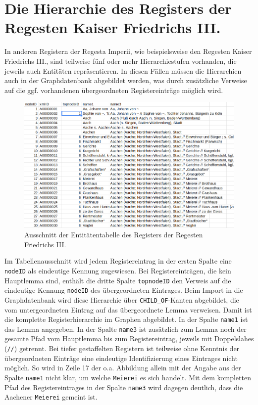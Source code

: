 \documentclass[ngerman,]{scrreprt}
\begin{document}
\section{Die Hierarchie des Registers der Regesten Kaiser Friedrichs III.}\label{die-hierarchie-des-registers-der-regesten-kaiser-friedrichs-iii.}

In anderen Registern der Regesta Imperii, wie beispielsweise den Regesten Kaiser Friedrichs III., sind teilweise fünf oder mehr Hierarchiestufen vorhanden, die jeweils auch Entitäten repräsentieren. In diesen Fällen müssen die Hierarchien auch in der Graphdatenbank abgebildet werden, was durch zusätzliche Verweise auf die ggf. vorhandenen übergeordneten Registereinträge möglich wird.

\begin{figure}
\centering
\includegraphics{Bilder/RI2Graph/RegisterF3-Hierarchie.png}
\caption{Ausschnitt der Entitätentabelle des Registers der Regesten Friedrichs III.}
\end{figure}

Im Tabellenausschnitt wird jedem Registereintrag in der ersten Spalte eine \texttt{nodeID} als eindeutige Kennung zugewiesen. Bei Registereinträgen, die kein Hauptlemma sind, enthält die dritte Spalte \texttt{topnodeID} den Verweis auf die eindeutige Kennung \texttt{nodeID} des übergeordneten Eintrages. Beim Import in die Graphdatenbank wird diese Hierarchie über \texttt{CHILD\_OF}-Kanten abgebildet, die vom untergeordneten Eintrag auf das übergeordnete Lemma verweisen. Damit ist die komplette Registerhierarchie im Graphen abgebildet. In der Spalte \texttt{name1} ist das Lemma angegeben. In der Spalte \texttt{name3} ist zusätzlich zum Lemma noch der gesamte Pfad vom Hauptlemma bis zum Registereintrag, jeweils mit Doppelslahes (\texttt{//}) getrennt. Bei tiefer gestaffelten Registern ist teilweise ohne Kenntnis der übergeordneten Einträge eine eindeutige Identifizierung eines Eintrages nicht möglich. So wird in Zeile 17 der o.a. Abbildung allein mit der Angabe aus der Spalte \texttt{name1} nicht klar, um welche \texttt{Meierei} es sich handelt. Mit dem kompletten Pfad des Registereintrages in der Spalte \texttt{name3} wird dagegen deutlich, dass die Aachener \texttt{Meierei} gemeint ist.
\end{document}

